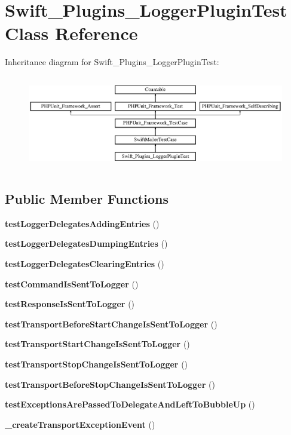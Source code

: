 \section{Swift\+\_\+\+Plugins\+\_\+\+Logger\+Plugin\+Test Class Reference}
\label{class_swift___plugins___logger_plugin_test}
Inheritance diagram for Swift\+\_\+\+Plugins\+\_\+\+Logger\+Plugin\+Test\+:\begin{figure}[H]
\begin{center}
\leavevmode
\includegraphics[height=4.129793cm]{class_swift___plugins___logger_plugin_test}
\end{center}
\end{figure}
\subsection*{Public Member Functions}
\begin{DoxyCompactItemize}
\item 
{\bf test\+Logger\+Delegates\+Adding\+Entries} ()
\item 
{\bf test\+Logger\+Delegates\+Dumping\+Entries} ()
\item 
{\bf test\+Logger\+Delegates\+Clearing\+Entries} ()
\item 
{\bf test\+Command\+Is\+Sent\+To\+Logger} ()
\item 
{\bf test\+Response\+Is\+Sent\+To\+Logger} ()
\item 
{\bf test\+Transport\+Before\+Start\+Change\+Is\+Sent\+To\+Logger} ()
\item 
{\bf test\+Transport\+Start\+Change\+Is\+Sent\+To\+Logger} ()
\item 
{\bf test\+Transport\+Stop\+Change\+Is\+Sent\+To\+Logger} ()
\item 
{\bf test\+Transport\+Before\+Stop\+Change\+Is\+Sent\+To\+Logger} ()
\item 
{\bf test\+Exceptions\+Are\+Passed\+To\+Delegate\+And\+Left\+To\+Bubble\+Up} ()
\item 
{\bf \+\_\+create\+Transport\+Exception\+Event} ()
\end{DoxyCompactItemize}
